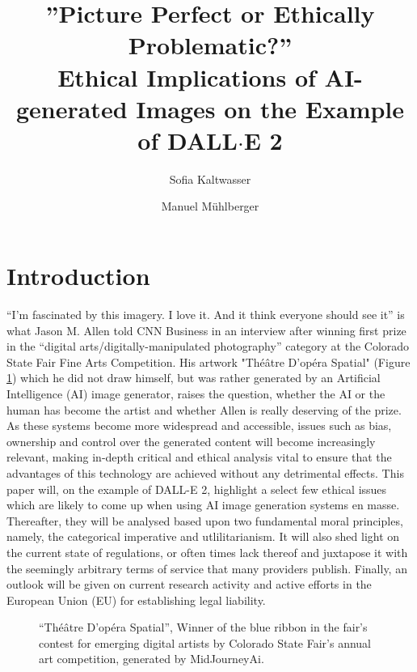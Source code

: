 \documentclass[9pt,twocolumn,twoside]{osajnl}
\title{”Picture Perfect or Ethically Problematic?” \\ Ethical Implications of AI-generated Images on the Example of DALL$\cdot$E 2}
\author[1]{Sofia Kaltwasser}
\author[2]{Manuel Mühlberger}
\affil[1]{University of Potsdam}
\affil[2]{School of Computation, Information and Technology, TU Munich}
\begin{document}
\maketitle

\section{Introduction}
“I’m fascinated by this imagery. I love it. And it think everyone should see it” is what Jason M. Allen told CNN Business in an interview after winning first prize in the “digital arts/digitally-manipulated photography” category at the Colorado State Fair Fine Arts Competition\cite{JasonMAllenCNN}.
His artwork "Théâtre D’opéra Spatial" (Figure \ref{Theatre}) which he did not draw himself, but was rather generated by an Artificial Intelligence (AI) image generator, raises the question, whether the AI or the human has become the artist and whether Allen is really deserving of the prize.
As these systems become more widespread and accessible, issues such as bias, ownership and control over the generated content will become increasingly relevant, making in-depth critical and ethical analysis vital to ensure that the advantages of this technology are achieved without any detrimental effects. 
This paper will, on the example of DALL-E 2, highlight a select few ethical issues which are likely to come up when using AI image generation systems en masse. 
Thereafter, they will be analysed based upon two fundamental moral principles, namely, the categorical imperative and utlilitarianism. 
It will also shed light on the current state of regulations, or often times lack thereof and juxtapose it with the seemingly arbitrary terms of service that many providers publish. 
Finally, an outlook will be given on current research activity and active efforts in the European Union (EU) for establishing legal liability. 
\begin{figure}[htbp]
	\centering
	\caption{“Théâtre D’opéra Spatial”, Winner of the blue ribbon in the fair’s contest for emerging digital artists by Colorado State Fair’s annual art competition, generated by MidJourneyAi\cite{OperaSpecial}.}
	\label{Theatre}
\end{figure}
\end{document}
